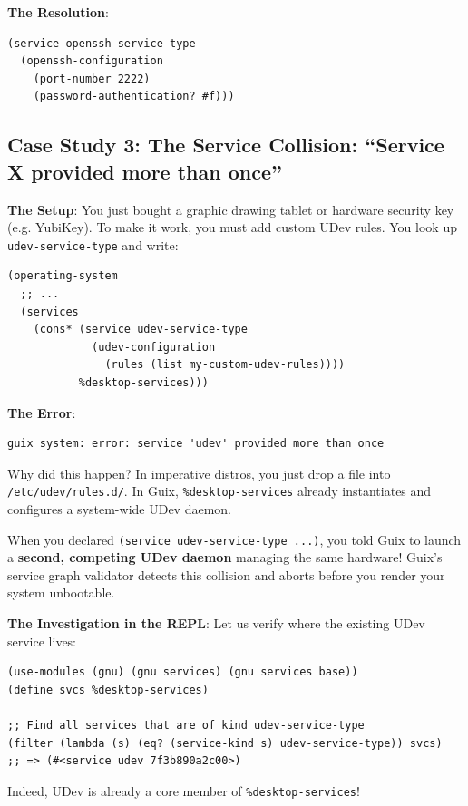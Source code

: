 \textbf{The Resolution}:
\begin{lstlisting}[style=guixscheme]
(service openssh-service-type
  (openssh-configuration
    (port-number 2222)
    (password-authentication? #f)))
\end{lstlisting}

\subsection{Case Study 3: The Service Collision: ``Service X provided more than once''}

\textbf{The Setup}: You just bought a graphic drawing tablet or hardware security key (e.g. YubiKey). To make it work, you must add custom UDev rules. You look up \texttt{udev-service-type} and write:

\begin{lstlisting}[style=guixscheme]
(operating-system
  ;; ...
  (services
    (cons* (service udev-service-type
             (udev-configuration
               (rules (list my-custom-udev-rules))))
           %desktop-services)))
\end{lstlisting}

\textbf{The Error}:
\begin{lstlisting}[style=guixcli]
guix system: error: service 'udev' provided more than once
\end{lstlisting}

\begin{tearsbox}
Why did this happen? In imperative distros, you just drop a file into \texttt{/etc/udev/rules.d/}. In Guix, \texttt{\%desktop-services} already instantiates and configures a system-wide UDev daemon. 

When you declared \texttt{(service udev-service-type ...)}, you told Guix to launch a \textbf{second, competing UDev daemon} managing the same hardware! Guix's service graph validator detects this collision and aborts before you render your system unbootable.
\end{tearsbox}

\textbf{The Investigation in the REPL}: Let us verify where the existing UDev service lives:
\begin{lstlisting}[style=guixscheme]
(use-modules (gnu) (gnu services) (gnu services base))
(define svcs %desktop-services)

;; Find all services that are of kind udev-service-type
(filter (lambda (s) (eq? (service-kind s) udev-service-type)) svcs)
;; => (#<service udev 7f3b890a2c00>)
\end{lstlisting}
Indeed, UDev is already a core member of \texttt{\%desktop-services}!

